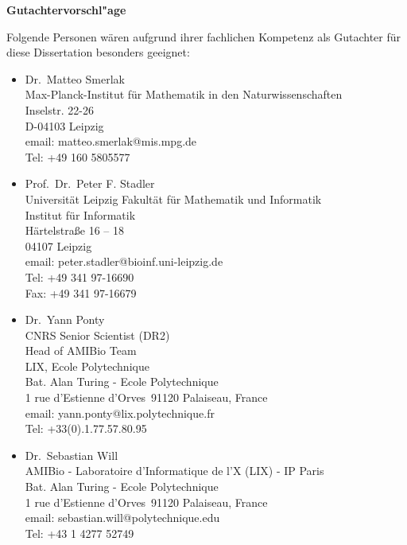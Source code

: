 \newpage
\begin{center}
{\Large \bf 
Gutachtervorschl"age}\vspace{0.5cm}
\end{center}

Folgende Personen w\"aren aufgrund ihrer fachlichen Kompetenz als Gutachter f\"ur diese Dissertation besonders geeignet:
\begin{itemize}
	
\item Dr.\   Matteo Smerlak\\
Max-Planck-Institut f\"ur Mathematik in den Naturwissenschaften\\
Inselstr. 22-26 \\ 
D-04103 Leipzig\\
email: matteo.smerlak@mis.mpg.de\\
Tel: +49 160 5805577\\


\item Prof.\ Dr.\ Peter F. Stadler\\
Universit\"at Leipzig
Fakult\"at für Mathematik und Informatik\\
Institut f\"ur Informatik\\
Härtelstraße 16 – 18 \\ 
04107 Leipzig\\
email: peter.stadler@bioinf.uni-leipzig.de\\
Tel: +49 341 97-16690\\
Fax: +49 341 97-16679\\

\item  Dr.\ Yann Ponty\\ 
CNRS Senior Scientist (DR2)\\
Head of AMIBio Team\\
LIX, Ecole Polytechnique\\
Bat. Alan Turing - Ecole Polytechnique\\
1 rue d’Estienne d’Orves\
91120 Palaiseau, France \\
 email: yann.ponty@lix.polytechnique.fr\\
 Tel: +33(0).1.77.57.80.95\\

\item  Dr.\ Sebastian Will\\
AMIBio - Laboratoire d'Informatique de l'X (LIX) - IP Paris \\
 Bat. Alan Turing - Ecole Polytechnique\\
 1 rue d’Estienne d’Orves\
 91120 Palaiseau, France \\
 email: sebastian.will@polytechnique.edu\\
 Tel: +43 1 4277 52749\\
\end{itemize}

